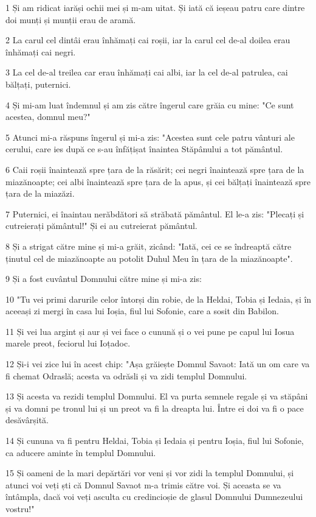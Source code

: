 \par 1 Și am ridicat iarăși ochii mei și m-am uitat. Și iată că ieșeau patru care dintre doi munți și munții erau de aramă.
\par 2 La carul cel dintâi erau înhămați cai roșii, iar la carul cel de-al doilea erau înhămați cai negri.
\par 3 La cel de-al treilea car erau înhămați cai albi, iar la cel de-al patrulea, cai bălțați, puternici.
\par 4 Și mi-am luat îndemnul și am zis către îngerul care grăia cu mine: "Ce sunt acestea, domnul meu?"
\par 5 Atunci mi-a răspuns îngerul și mi-a zis: "Acestea sunt cele patru vânturi ale cerului, care ies după ce s-au înfățișat înaintea Stăpânului a tot pământul.
\par 6 Caii roșii înaintează spre țara de la răsărit; cei negri înaintează spre țara de la miazănoapte; cei albi înaintează spre țara de la apus, și cei bălțați înaintează spre țara de la miazăzi.
\par 7 Puternici, ei înaintau nerăbdători să străbată pământul. El le-a zis: "Plecați și cutreierați pământul!" Și ei au cutreierat pământul.
\par 8 Și a strigat către mine și mi-a grăit, zicând: "Iată, cei ce se îndreaptă către ținutul cel de miazănoapte au potolit Duhul Meu în țara de la miazănoapte".
\par 9 Și a fost cuvântul Domnului către mine și mi-a zis:
\par 10 "Tu vei primi darurile celor întorși din robie, de la Heldai, Tobia și Iedaia, și în aceeași zi mergi în casa lui Ioșia, fiul lui Sofonie, care a sosit din Babilon.
\par 11 Și vei lua argint și aur și vei face o cunună și o vei pune pe capul lui Iosua marele preot, feciorul lui Ioțadoc.
\par 12 Și-i vei zice lui în acest chip: "Așa grăiește Domnul Savaot: Iată un om care va fi chemat Odraslă; acesta va odrăsli și va zidi templul Domnului.
\par 13 Și acesta va rezidi templul Domnului. El va purta semnele regale și va stăpâni și va domni pe tronul lui și un preot va fi la dreapta lui. Între ei doi va fi o pace desăvârșită.
\par 14 Și cununa va fi pentru Heldai, Tobia și Iedaia și pentru Ioșia, fiul lui Sofonie, ca aducere aminte în templul Domnului.
\par 15 Și oameni de la mari depărtări vor veni și vor zidi la templul Domnului, și atunci voi veți ști că Domnul Savaot m-a trimis către voi. Și aceasta se va întâmpla, dacă voi veți asculta cu credincioșie de glasul Domnului Dumnezeului vostru!"

